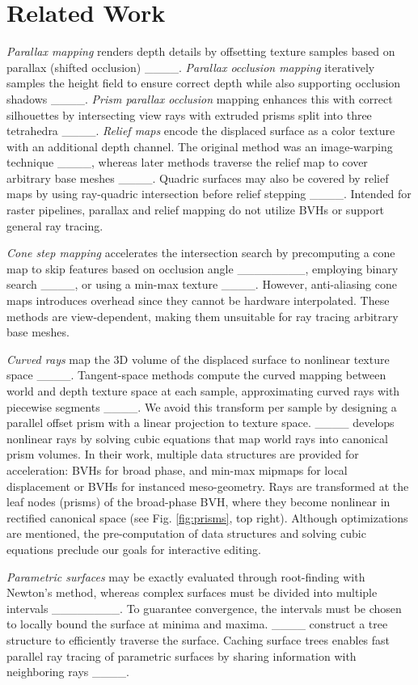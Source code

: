 \section{Related Work}
\textit{Parallax mapping} renders depth details by offsetting texture samples based on parallax (shifted occlusion) ____. \textit{Parallax occlusion mapping} iteratively samples the height field to ensure correct depth while also supporting occlusion shadows ____. \textit{Prism parallax occlusion} mapping enhances this with correct silhouettes by intersecting view rays with extruded prisms split into three tetrahedra ____. \textit{Relief maps} encode the displaced surface as a color texture with an additional depth channel. The original method was an image-warping technique  ____, whereas later methods traverse the relief map to cover arbitrary base meshes ____. Quadric surfaces may also be covered by relief maps by using ray-quadric intersection before relief stepping ____. Intended for raster pipelines, parallax and relief mapping do not utilize BVHs or support general ray tracing. 

\textit{Cone step mapping} accelerates the intersection search by precomputing a cone map to skip features based on occlusion angle  ________, employing binary search ____, or using a min-max texture ____. However, anti-aliasing cone maps introduces overhead since they cannot be hardware interpolated. These methods are view-dependent, making them unsuitable for ray tracing arbitrary base meshes. 

\textit{Curved rays} map the 3D volume of the displaced surface to nonlinear texture space ____. Tangent-space methods compute the curved mapping between world and depth texture space at each sample, approximating curved rays with piecewise segments ____. We avoid this transform per sample by designing a parallel offset prism with a linear projection to texture space. ____ develops nonlinear rays by solving cubic equations that map world rays into canonical prism volumes. In their work, multiple data structures are provided for acceleration: BVHs for broad phase, and min-max mipmaps for local displacement or BVHs for instanced meso-geometry. Rays are transformed at the leaf nodes (prisms) of the broad-phase BVH, where they become nonlinear in rectified canonical space (see Fig. \ref{fig:prisms}, top right). Although optimizations are mentioned, the pre-computation of data structures and solving cubic equations preclude our goals for interactive editing.

\textit{Parametric surfaces} may be exactly evaluated through root-finding with Newton’s method, whereas complex surfaces must be divided into multiple intervals ________. To guarantee convergence, the intervals must be chosen to locally bound the surface at minima and maxima. ____ construct a tree structure to efficiently traverse the surface. Caching surface trees enables fast parallel ray tracing of parametric surfaces by sharing information with neighboring rays ____. 

